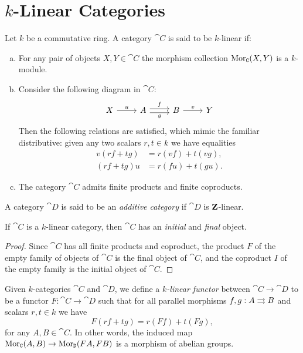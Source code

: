 \section{\texorpdfstring{\(k\)}{k}-Linear Categories}

\begin{definition}
\label{def:k-linear-category}
Let \(k\) be a commutative ring. A category \(\cat C\) is said to be
\(k\)-linear if:
\begin{enumerate}[(a)]\setlength\itemsep{0em}
\item For any pair of objects \(X, Y \in \cat C\) the morphism collection
  \(\operatorname{Mor}_{\texttt C}(X, Y)\) is a \(k\)-module.

\item Consider the following diagram in \(\cat C\):
  \[
  \begin{tikzcd}
  X \ar[r, "u"]
  &A \ar[r, shift left, "f"] \ar[r, shift right, "g"']
  &B \ar[r, "v"]
  &Y
  \end{tikzcd}
  \]
  Then the following relations are satisfied, which mimic the familiar
  distributive: given any two scalars \(r, t \in k\) we have equalities
  \begin{align*}
    v (r f + t g) &= r (v f) + t (v g), \\
    (r f + t g) u &= r (f u) + t (g u).
  \end{align*}

\item The category \(\cat C\) admits finite products and finite coproducts.
\end{enumerate}
A category \(\cat D\) is said to be an \emph{additive category} if \(\cat D\) is
\(\mathbf{Z}\)-linear.
\end{definition}

\begin{corollary}
\label{cor:k-linear-has-initial-and-final-obj}
If \(\cat C\) is a \(k\)-linear category, then \(\cat C\) has an \emph{initial}
and \emph{final} object.
\end{corollary}

\begin{proof}
Since \(\cat C\) has all finite products and coproduct, the product \(F\) of the
empty family of objects of \(\cat C\) is the final object of \(\cat C\), and the
coproduct \(I\) of the empty family is the initial object of \(\cat C\).
\end{proof}

\begin{definition}
\label{def:k-linear-functor}
Given \(k\)-categories \(\cat C\) and \(\cat D\), we define a
\emph{\(k\)-linear functor} between \(\cat C \to \cat D\) to be a functor
\(F: \cat C \to \cat D\) such that for all parallel morphisms
\(f, g: A \rightrightarrows B\) and scalars \(r, t \in k\) we have
\[
F(r f + t g) = r (F f) + t (F g),
\]
for any \(A, B \in \cat C\). In other words, the induced map
\(\operatorname{Mor}_{\texttt C}(A, B) \to \operatorname{Mor}_{\texttt D}(F A, F B)\) is a morphism of abelian
groups.
\end{definition}

